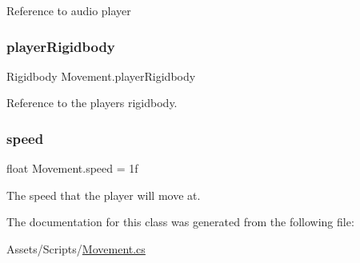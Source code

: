 Reference to audio player \mbox{\label{class_movement_aa619dd60eb0edd2b483e3a131e3dfadf}} 
\subsubsection{\texorpdfstring{playerRigidbody}{playerRigidbody}}
{\footnotesize\ttfamily Rigidbody Movement.\+player\+Rigidbody\hspace{0.3cm}{\ttfamily [private]}}

Reference to the player\textquotesingle{}s rigidbody. \mbox{\label{class_movement_aba07bc6bfeba07294bfd68dec4962388}} 
\subsubsection{\texorpdfstring{speed}{speed}}
{\footnotesize\ttfamily float Movement.\+speed = 1f}

The speed that the player will move at. 

The documentation for this class was generated from the following file\+:\begin{DoxyCompactItemize}
\item 
Assets/\+Scripts/\mbox{\hyperlink{_movement_8cs}{Movement.\+cs}}\end{DoxyCompactItemize}
